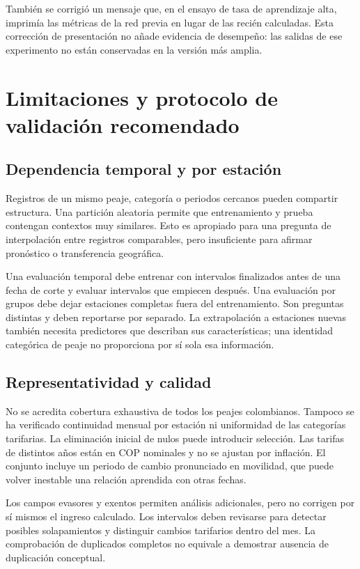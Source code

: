 \documentclass[11pt,a4paper]{article}
\begin{document}
También se corrigió un mensaje que, en el ensayo de tasa de aprendizaje alta, imprimía las métricas de la red previa en lugar de las recién calculadas. Esta corrección de presentación no añade evidencia de desempeño: las salidas de ese experimento no están conservadas en la versión más amplia.
\par\medskip

\section{Limitaciones y protocolo de validación recomendado}
\subsection{Dependencia temporal y por estación}
Registros de un mismo peaje, categoría o periodos cercanos pueden compartir estructura. Una partición aleatoria permite que entrenamiento y prueba contengan contextos muy similares. Esto es apropiado para una pregunta de interpolación entre registros comparables, pero insuficiente para afirmar pronóstico o transferencia geográfica.

Una evaluación temporal debe entrenar con intervalos finalizados antes de una fecha de corte y evaluar intervalos que empiecen después. Una evaluación por grupos debe dejar estaciones completas fuera del entrenamiento. Son preguntas distintas y deben reportarse por separado. La extrapolación a estaciones nuevas también necesita predictores que describan sus características; una identidad categórica de peaje no proporciona por sí sola esa información.

\subsection{Representatividad y calidad}
No se acredita cobertura exhaustiva de todos los peajes colombianos. Tampoco se ha verificado continuidad mensual por estación ni uniformidad de las categorías tarifarias. La eliminación inicial de nulos puede introducir selección. Las tarifas de distintos años están en COP nominales y no se ajustan por inflación. El conjunto incluye un periodo de cambio pronunciado en movilidad, que puede volver inestable una relación aprendida con otras fechas.

Los campos evasores y exentos permiten análisis adicionales, pero no corrigen por sí mismos el ingreso calculado. Los intervalos deben revisarse para detectar posibles solapamientos y distinguir cambios tarifarios dentro del mes. La comprobación de duplicados completos no equivale a demostrar ausencia de duplicación conceptual.
\end{document}
